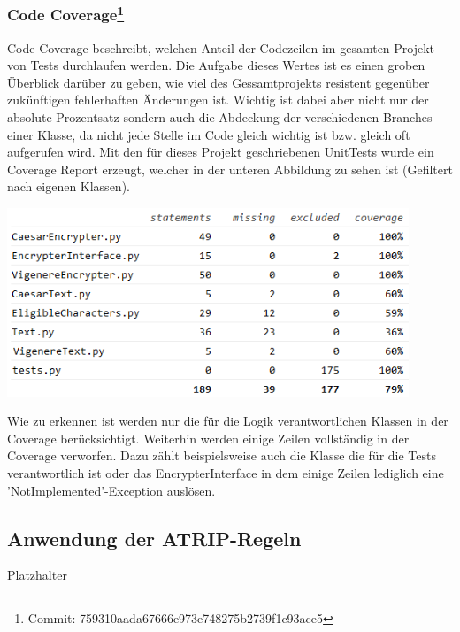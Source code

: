 \documentclass[12pt]{article}
\begin{document}
\subsubsection[Code Coverage]{Code Coverage\protect\footnote{Commit: 759310aada67666e973e748275b2739f1c93ace5}}
Code Coverage beschreibt, welchen Anteil der Codezeilen im gesamten Projekt von Tests durchlaufen werden. Die Aufgabe dieses Wertes ist es einen groben Überblick darüber zu geben, wie viel des Gessamtprojekts resistent gegenüber zukünftigen fehlerhaften Änderungen ist. Wichtig ist dabei aber nicht nur der absolute Prozentsatz sondern auch die Abdeckung der verschiedenen Branches einer Klasse, da nicht jede Stelle im Code gleich wichtig ist bzw. gleich oft aufgerufen wird. Mit den für dieses Projekt geschriebenen UnitTests wurde ein Coverage Report erzeugt, welcher in der unteren Abbildung zu sehen ist (Gefiltert nach eigenen Klassen).
\begin{center}
	\includegraphics[width=12cm]{bilder/Coverage.png}
\end{center}
Wie zu erkennen ist werden nur die für die Logik verantwortlichen Klassen in der Coverage berücksichtigt. Weiterhin werden einige Zeilen vollständig in der Coverage verworfen. Dazu zählt beispielsweise auch die Klasse die für die Tests verantwortlich ist oder das EncrypterInterface in dem einige Zeilen lediglich eine 'NotImplemented'-Exception auslösen.
\subsection{Anwendung der ATRIP-Regeln}
Platzhalter


%
\end{document}
